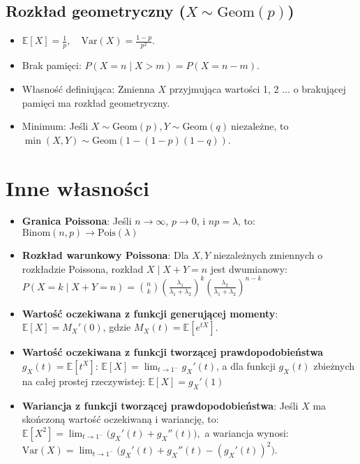 \documentclass{article}
\theoremstyle{definition}
\theoremstyle{remark}
\begin{document}
\begin{multicols}{2}
    \subsection*{Rozkład geometryczny (\( X \sim \text{Geom}(p) \))}
    \begin{itemize}[itemsep=0pt, left=0pt]
        \item \(\mathbb{E}[X] = \frac{1}{p}, \quad \text{Var}(X) = \frac{1-p}{p^2}\).
        \item Brak pamięci: \( P(X=n \mid X>m) = P(X=n-m) \).
        \item Własność definiująca: Zmienna \( X \) przyjmująca wartości 1, 2 \(\ldots\)  o brakującej pamięci ma rozkład geometryczny.
        \item Minimum: Jeśli \( X \sim \text{Geom}(p), Y \sim \text{Geom}(q) \ \text{niezależne} \), to \( \min(X, Y) \sim \text{Geom}(1-(1-p)(1-q)) \).
    \end{itemize}
    
    \section*{Inne własności}
    \begin{itemize}
    
    \item \textbf{Granica Poissona}: Jeśli \( n \to \infty \), \( p \to 0 \), i \( np = \lambda \), to: \(\text{Binom}(n, p) \to \text{Pois}(\lambda)\)
    
    \item \textbf{Rozkład warunkowy Poissona}: Dla \( X, Y \) niezależnych zmiennych o rozkładzie Poissona, rozkład \( X \mid X + Y = n \) jest dwumianowy:
    \(
    P(X = k \mid X + Y = n) = \binom{n}{k} \left( \frac{\lambda_1}{\lambda_1 + \lambda_2} \right)^k \left( \frac{\lambda_2}{\lambda_1 + \lambda_2} \right)^{n-k}
    \)
    
    \item \textbf{Wartość oczekiwana z funkcji generującej momenty}: \(\mathbb{E}[X] = M_X'(0)\), gdzie \( M_X(t) = \mathbb{E}[e^{tX}] \).
    
    \item \textbf{Wartość oczekiwana z funkcji tworzącej prawdopodobieństwa} \( g_X(t) = \mathbb{E}[t^X] \): \(\mathbb{E}[X] = \lim_{t \to 1^-} g_X'(t)\), 
    a dla funkcji \( g_X(t) \) zbieżnych na całej prostej rzeczywistej: \(\mathbb{E}[X] = g_X'(1)\)
    
    \item \textbf{Wariancja z funkcji tworzącej prawdopodobieństwa}: 
    Jeśli \( X \) ma skończoną wartość oczekiwaną i wariancję, to:
    \(
    \mathbb{E}[X^2] = \lim_{t \to 1^-} \big(g_X'(t) + g_X''(t)\big),
    \)
    a wariancja wynosi:
    \(
    \mathrm{Var}(X) = \lim_{t \to 1^-} \big(g_X'(t) + g_X''(t) - (g_X'(t))^2\big).
    \)
    

\end{itemize}
\end{multicols}
\end{document}
